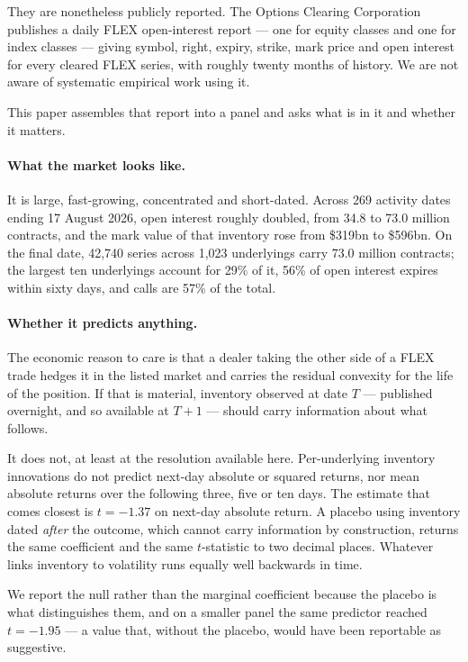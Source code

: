 \documentclass[11pt]{article}
\begin{document}
They are nonetheless publicly reported. The Options Clearing Corporation publishes a
daily FLEX open-interest report --- one for equity classes and one for index classes
--- giving symbol, right, expiry, strike, mark price and open interest for every
cleared FLEX series, with roughly twenty months of history. We are not aware of
systematic empirical work using it.

This paper assembles that report into a panel and asks what is in it and whether it
matters.

\paragraph{What the market looks like.} It is large, fast-growing, concentrated and
short-dated. Across 269 activity dates ending 17 August 2026, open interest roughly
doubled, from 34.8 to 73.0 million contracts, and the mark value of that inventory rose
from \$319bn to \$596bn. On the final date, 42,740 series across 1,023 underlyings carry
73.0 million contracts; the largest ten underlyings account for 29\% of it, 56\% of
open interest expires within sixty days, and calls are 57\% of the total.

\paragraph{Whether it predicts anything.} The economic reason to care is that a dealer
taking the other side of a FLEX trade hedges it in the listed market and carries the
residual convexity for the life of the position. If that is material, inventory
observed at date $T$ --- published overnight, and so available at $T+1$ --- should carry
information about what follows.

It does not, at least at the resolution available here. Per-underlying inventory
innovations do not predict next-day absolute or squared returns, nor mean absolute
returns over the following three, five or ten days. The estimate that comes closest is
$t=-1.37$ on next-day absolute return. A placebo using inventory dated \emph{after} the
outcome, which cannot carry information by construction, returns the same coefficient
and the same $t$-statistic to two decimal places. Whatever links inventory to
volatility runs equally well backwards in time.

We report the null rather than the marginal coefficient because the placebo is what
distinguishes them, and on a smaller panel the same predictor reached $t=-1.95$ --- a
value that, without the placebo, would have been reportable as suggestive.
\end{document}
